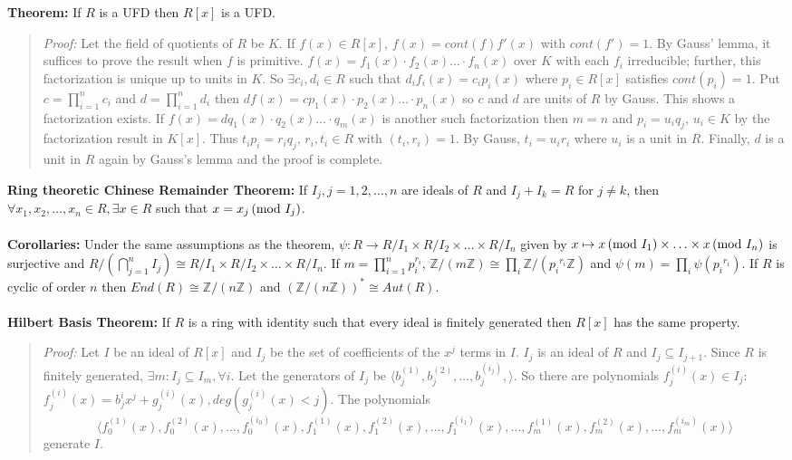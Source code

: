 {\bf Theorem:} If $R$ is a UFD then
$R[x]$ is a UFD. 
\begin{quote}
\emph{Proof:}
Let the field of quotients of $R$ be $K$.  If $f(x) \in R[x]$, $f(x)= cont(f) f'(x)$
with $cont(f')=1$.  By Gauss' lemma, it suffices to prove the result
when $f$ is primitive.
$f(x)= f_1(x) \cdot f_2(x) \ldots \cdot f_n(x)$ over $K$ with each $f_i$ irreducible;
further, this factorization is unique up to units in $K$.  So $\exists c_i, d_i \in R$ 
such that 
$d_i f_i(x)= c_i p_i(x)$ where $p_i \in R[x]$ satisfies $cont(p_i)=1$.
Put $c= \prod_{i=1}^n c_i$ and
$d= \prod_{i=1}^n d_i$  then $d f(x)=
c p_1(x) \cdot p_2(x) \ldots \cdot p_n(x)$ so $c$ and $d$ are units of $R$ by Gauss.
This shows a factorization exists.
If $f(x)= d q_1(x) \cdot q_2(x) \ldots \cdot q_m(x)$
is another such factorization then $m=n$  
and $p_i= u_i q_j$, $u_i \in K$ by the factorization result in $K[x]$.  Thus
$t_i p_i= r_i q_j$, $r_i, t_i \in R$ with $(t_i, r_i)= 1$.  By Gauss, $t_i= u_i r_i$
where $u_i$ is a unit in $R$.
Finally, 
$d$ is a unit in $R$ again by Gauss's lemma and the proof is complete.
\end{quote}
{\bf Ring theoretic Chinese Remainder Theorem:} 
If $I_j, j= 1,2, \ldots, n$ are ideals of $R$ and
$I_j + I_k = R$ for $j \ne k$, then $\forall x_1 , x_2, \ldots , x_n \in R, \exists
x \in R$ such that $x= x_j \thinspace \textnormal{(mod } I_j \textnormal{)}$.
\\
\\
{\bf Corollaries:} Under the same assumptions as the theorem,
$\psi: R \rightarrow R/I_1 \times R/I_2 \times \ldots \times R/I_n$ given by
$x \mapsto x \thinspace \textnormal{(mod } I_1 \textnormal{)} \times \ldots \times x \thinspace \textnormal{(mod } I_n \textnormal{)}$ is surjective and
$R/(\bigcap_{j=1}^n I_j) \cong R/I_1 \times R/I_2 \times \ldots \times R/I_n$.
If $m= \prod_{i=1}^n p_i^{r_i}$,
${\mathbb Z}/(m{\mathbb Z}) \cong \prod_i {\mathbb Z}/({p_i}^{r_i}{\mathbb Z})$ and
$\psi(m)= \prod_i \psi({p_i}^{r_i})$.  If $R$ is cyclic of order $n$ then
$End(R) \cong {\mathbb Z}/(n{\mathbb Z})$ and
$({\mathbb Z}/(n{\mathbb Z}))^* \cong Aut(R)$.
\\
\\
{\bf Hilbert Basis Theorem: }
If $R$ is a ring with identity such that every ideal is finitely 
generated then $R[x]$ has the same property.
\begin{quote}
\emph{Proof:}
Let $I$ be an ideal of $R[x]$ and $I_j$ be the set of coefficients
of the $x^j$ terms in $I$.  $I_j$ is an ideal of $R$ and $I_j \subseteq I_{j+1}$.
Since $R$ is finitely generated, $\exists m: I_j \subseteq I_m, \forall i$.
Let the generators of $I_j$ be 
$\langle b^{(1)}_j, b^{(2)}_j,  \ldots , b^{(i_j)}_j, \rangle$.  So there are
polynomials $f_j^{(i)}(x) \in I_j$:
$f_j^{(i)}(x)= b_j^{i} x^j + g_j^{(i)}(x), deg (g_j^{(i)}(x)< j)$.
The polynomials
$$\langle
f_0^{(1)}(x),
f_0^{(2)}(x), \ldots,
f_0^{(i_0)}(x), 
f_1^{(1)}(x),
f_1^{(2)}(x), \ldots,
f_1^{(i_1)}(x), 
\ldots,
f_m^{(1)}(x),
f_m^{(2)}(x), \ldots,
f_m^{(i_m)}(x)
\rangle$$
generate $I$.
\end{quote}
